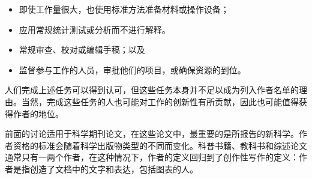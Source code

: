\begin{itemize}
\item 即使工作量很大，也使用标准方法准备材料或操作设备；
\item 应用常规统计测试或分析而不进行解释。
\item 常规审查、校对或编辑手稿；以及
\item 监督参与工作的人员，审批他们的项目，或确保资源的到位。
\end{itemize}

人们完成上述任务可以得到认可，但这些任务本身并不足以成为列入作者名单的理由。当然，完成这些任务的人也可能对工作的创新性有所贡献，因此也可能值得获得作者的地位。

前面的讨论适用于科学期刊论文，在这些论文中，最重要的是所报告的新科学。作者资格的标准会随着科学出版物类型的不同而变化。科普书籍、教科书和综述论文通常只有一两个作者，在这种情况下，作者的定义回归到了创作性写作的定义：作者是指创造了文档中的文字和表达，包括图表的人。

